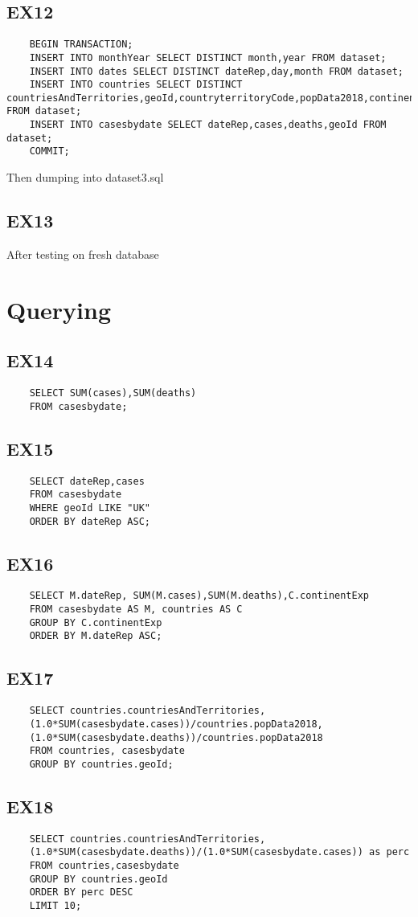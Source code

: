 \documentclass{article}
\begin{document}
\subsection{EX12}
\begin{lstlisting}
	BEGIN TRANSACTION;
	INSERT INTO monthYear SELECT DISTINCT month,year FROM dataset;
	INSERT INTO dates SELECT DISTINCT dateRep,day,month FROM dataset;
	INSERT INTO countries SELECT DISTINCT countriesAndTerritories,geoId,countryterritoryCode,popData2018,continentExp FROM dataset;
	INSERT INTO casesbydate SELECT dateRep,cases,deaths,geoId FROM dataset;
	COMMIT;
\end{lstlisting}
Then dumping into dataset3.sql
\subsection{EX13}
After testing on fresh database
\section{Querying}
\subsection{EX14}
\begin{lstlisting}
	SELECT SUM(cases),SUM(deaths) 
	FROM casesbydate;
\end{lstlisting}
\subsection{EX15}
\begin{lstlisting}
	SELECT dateRep,cases 
	FROM casesbydate 
	WHERE geoId LIKE "UK" 
	ORDER BY dateRep ASC;
\end{lstlisting}
\subsection{EX16}
\begin{lstlisting}
	SELECT M.dateRep, SUM(M.cases),SUM(M.deaths),C.continentExp
	FROM casesbydate AS M, countries AS C
	GROUP BY C.continentExp
	ORDER BY M.dateRep ASC;
\end{lstlisting}
\subsection{EX17}
\begin{lstlisting}
	SELECT countries.countriesAndTerritories,
	(1.0*SUM(casesbydate.cases))/countries.popData2018,
	(1.0*SUM(casesbydate.deaths))/countries.popData2018 
	FROM countries, casesbydate
	GROUP BY countries.geoId;
\end{lstlisting}
\subsection{EX18}
\begin{lstlisting}
	SELECT countries.countriesAndTerritories,
	(1.0*SUM(casesbydate.deaths))/(1.0*SUM(casesbydate.cases)) as perc 
	FROM countries,casesbydate 
	GROUP BY countries.geoId 
	ORDER BY perc DESC 
	LIMIT 10;
\end{lstlisting}
\end{document}
